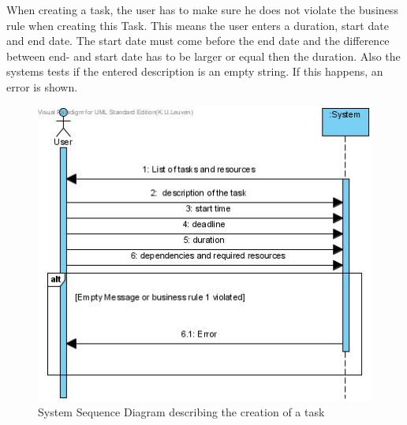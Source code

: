 				When creating a task, the user has to make sure he does not violate the business rule when creating this Task. This means the user enters a duration, start date and end date. The start date must come before the end date and the difference between end- and start date has to be larger or equal then the duration. Also the systems tests if the entered description is an empty string. If this happens, an error is shown.\\
				\begin{figure}[h!]
					\begin{center}
						\includegraphics[scale=0.5]{images/ssd_create_task.jpg}
					\end{center}
					\caption{System Sequence Diagram describing the creation of a task}
				\end{figure}
